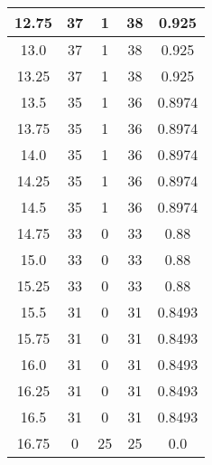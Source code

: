 \documentclass[letterpaper, 12pt]{article}
\begin{document}
\begin{longtable}{|c|c|c|c|c|}
\hline
12.75 & 37 & 1 & 38 & 0.925 \\
\hline
13.0 & 37 & 1 & 38 & 0.925 \\
\hline
13.25 & 37 & 1 & 38 & 0.925 \\
\hline
13.5 & 35 & 1 & 36 & 0.8974 \\
\hline
13.75 & 35 & 1 & 36 & 0.8974 \\
\hline
14.0 & 35 & 1 & 36 & 0.8974 \\
\hline
14.25 & 35 & 1 & 36 & 0.8974 \\
\hline
14.5 & 35 & 1 & 36 & 0.8974 \\
\hline
14.75 & 33 & 0 & 33 & 0.88 \\
\hline
15.0 & 33 & 0 & 33 & 0.88 \\
\hline
15.25 & 33 & 0 & 33 & 0.88 \\
\hline
15.5 & 31 & 0 & 31 & 0.8493 \\
\hline
15.75 & 31 & 0 & 31 & 0.8493 \\
\hline
16.0 & 31 & 0 & 31 & 0.8493 \\
\hline
16.25 & 31 & 0 & 31 & 0.8493 \\
\hline
16.5 & 31 & 0 & 31 & 0.8493 \\
\hline
16.75 & 0 & 25 & 25 & 0.0 \\
\hline
\end{longtable}
\end{document}
